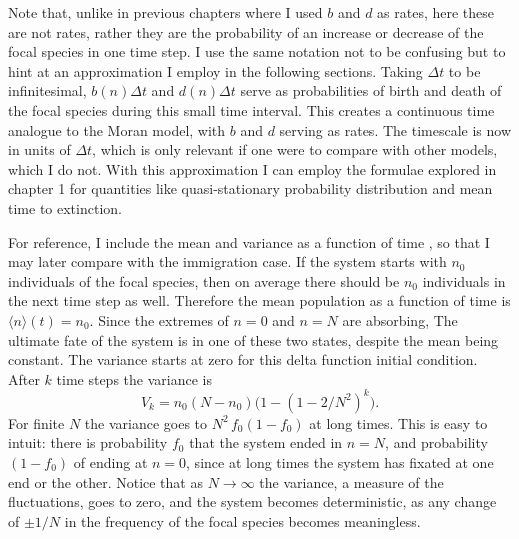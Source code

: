 Note that, unlike in previous chapters where I used $b$ and $d$ as rates, here these are not rates, rather they are the probability of an increase or decrease of the focal species in one time step. 
I use the same notation not to be confusing but to hint at an approximation I employ in the following sections. %
Taking $\Delta t$ to be infinitesimal, $b(n)\Delta t$ and $d(n)\Delta t$ serve as probabilities of birth and death of the focal species during this small time interval. 
This creates a continuous time analogue to the Moran model, with $b$ and $d$ serving as rates. 
The timescale is now in units of $\Delta t$, which is only relevant if one were to compare with other models, which I do not. 
With this approximation I can employ the formulae explored in chapter 1 for quantities like quasi-stationary probability distribution and mean time to extinction. 

For reference, I include the mean and variance as a function of time \cite{???, Moran1962}, so that I may later compare with the immigration case.
If the system starts with $n_0$ individuals of the focal species, then on average there should be $n_0$ individuals in the next time step as well.
Therefore the mean population as a function of time is $\langle n\rangle(t) = n_0$. 
Since the extremes of $n=0$ and $n=N$ are absorbing, The ultimate fate of the system is in one of these two states, despite the mean being constant. 
The variance starts at zero for this delta function initial condition. 
After $k$ time steps the variance is
\begin{equation*}
V_k = n_0(N-n_0) \big(1-(1-2/N^2)^k\big).
\end{equation*}
For finite $N$ the variance goes to $N^2 \, f_0(1-f_0)$ at long times. 
This is easy to intuit: there is probability $f_0$ that the system ended in $n=N$, and probability $(1-f_0)$ of ending at $n=0$, since at long times the system has fixated at one end or the other. 
Notice that as $N\rightarrow\infty$ the variance, a measure of the fluctuations, goes to zero, and the system becomes deterministic, as any change of $\pm 1/N$ in the frequency of the focal species becomes meaningless. 


